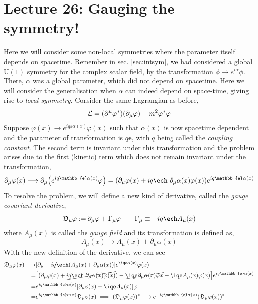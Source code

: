 \section*{Lecture 26: Gauging the symmetry!}
Here we will consider some non-local symmetries where the parameter itself depends on spacetime. Remember in sec. \ref{sec:intsym}, we had considered a global $\mathrm{U}(1)$ symmetry for the complex scalar field, by the transformation $\phi \to e^{i\alpha}\phi$. There, $\alpha$ was a global parameter, which did not depend on spacetime. Here we will consider the generalisation when $\alpha$ can indeed depend on space-time, giving rise to \textit{local symmetry}. 
Consider the same Lagrangian as before,
$$\mathcal L =(\partial^\mu \varphi^*)(\partial_\mu \varphi) -m^2 \varphi^* \varphi$$
Suppose $\varphi(x) \to e^{iq\mathbb{e}\alpha(x)}\varphi(x)$ such that $\alpha(x)$ is now spacetime dependent and the parameter of transformation is $q\mathbb{e}$, with $q$ being called the \textit{coupling constant}. The second term is invariant under this transformation and the problem arises due to the first (kinetic) term which does not remain invariant under the transformation,
$$\partial_\mu \varphi(x)\longrightarrow \partial_\mu \qty(e^{iq\mathbb{e}\alpha(x)}\varphi) = (\partial_\mu \varphi(x) + iq\ech\ \partial_\mu \alpha(x)\vph(x))e^{iq\mathbb{e}\alpha(x)}$$
To resolve the problem, we will define a new kind of derivative, called the \textit{gauge covariant derivative},
$$\gcod_\mu \varphi :=\partial_\mu \vph +\Gamma_\mu \vph \qquad \Gamma_\mu \equiv -iq\ech A_\mu(x)$$
where $A_\mu(x)$ is called the \textit{gauge field} and its transformation is defined as,
$$A_\mu(x) \longrightarrow A_\mu(x) +\partial_\mu\alpha(x)$$
With the new definition of the derivative, we can see
\begin{align*}
    \gcod_\mu\vph(x) \longrightarrow &\qty[\partial_\mu -iq\ech \qty(A_\mu(x)+\partial_\mu\alpha(x)) ]e^{\iqe \alpha(x)}\vph(x)\\
    =&\qty[(\partial_\mu \varphi(x) +\cancel{ iq\ech\ \partial_\mu \alpha(x)\vph(x)}) -\cancel{\iqe\partial_\mu \alpha(x)\vph{x} }- \iqe A_\mu(x)\vph(x)]  e^{iq\mathbb{e}\alpha(x)}\\
    =&e^{iq\mathbb{e}\alpha(x)}[\partial_\mu \varphi(x) - \iqe A_\mu(x)]\varphi\\
    =&e^{iq\mathbb{e}\alpha(x)} \gcod_\mu\vph(x) \implies ( \gcod_\mu\vph(x))^* \longrightarrow e^{-iq\mathbb{e}\alpha(x)} (\gcod_\mu\vph(x))^*
\end{align*}
